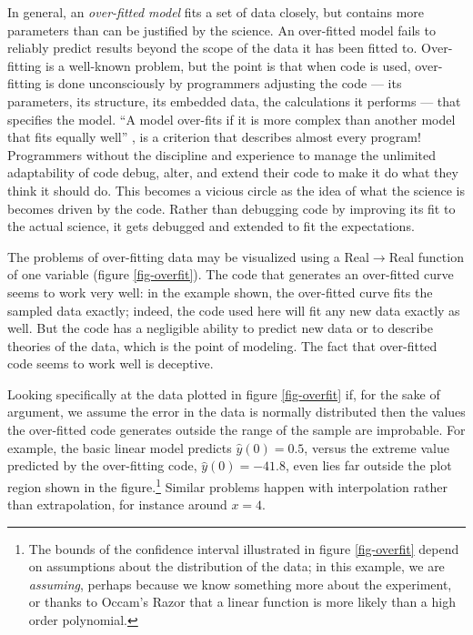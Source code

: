 \documentclass{comjnl}
\begin{document}
In general, an \emph{over-fitted model\/} fits a set of data closely, but contains more parameters than can be justified by the science. An over-fitted model fails to reliably predict results beyond the scope of the data it has been fitted to. Over-fitting is a well-known problem, but the point is that when code is used, over-fitting is done unconsciously by programmers adjusting the code --- its parameters, its structure, its embedded data, the calculations it performs --- that specifies the model. ``A model over-fits if it is  more complex than another model that fits equally well'' \cite{over-fit}, is a criterion that describes almost every program! Programmers without the discipline and experience to manage the unlimited adaptability of code debug, alter, and extend their code to make it do what they think it should do. This becomes a vicious circle as the idea of what the science is becomes driven by the code. Rather than debugging code by improving its fit to the actual science, it gets debugged and extended to fit the expectations.  

The problems of over-fitting data may be visualized using a Real$\rightarrow$Real function of one variable (figure \ref{fig-overfit}). The code that generates an over-fitted curve seems to work very well: in the example shown, the over-fitted curve fits the sampled data exactly; indeed, the code used here will fit any new data exactly as well. But the code has a negligible ability to predict new data or to describe theories of the data, which is the point of modeling. The fact that over-fitted code seems to work well is deceptive.

Looking specifically at the data plotted in figure \ref{fig-overfit} if, for the sake of argument, we assume the error in the data is normally distributed then the values the over-fitted code generates outside the range of the sample are improbable. For example, the basic linear model predicts
$\hat{y}(0)=0.5$, 
versus the extreme value predicted by the over-fitting code, 
$\hat{y}(0)=-41.8$, 
 even lies far outside the plot region shown in the figure.\footnote{The bounds of the confidence interval illustrated in figure \ref{fig-overfit} depend on assumptions about the distribution of the data; in this example, we are \emph{assuming}, perhaps because we know something more about the experiment, or thanks to Occam's Razor that a linear function is more likely than a high order polynomial.} Similar problems happen with interpolation rather than extrapolation, for instance around $x=4$.
\end{document}
